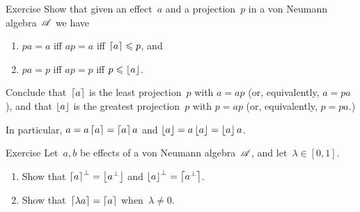 \documentclass[a]{subfiles}
\begin{document}
\begin{parsec}
\begin{point}{Exercise}%
Show that given an effect~$a$ and a projection~$p$
in a von Neumann algebra~$\mathscr{A}$ we have
\begin{enumerate}
\item
$pa=a$ iff $ap=a$ iff $\left\lceil a\right\rceil\leqslant p$, and
\item
$pa=p$ iff $ap=p$ iff $p\leqslant \left\lfloor a\right\rfloor$.
\end{enumerate}
Conclude that~$\left\lceil a\right\rceil$
is the least projection~$p$ with $a=a p$
(or, equivalently, $a=pa$),
and that $\left\lfloor a\right\rfloor$
is the greatest projection~$p$ with $p=a p$
(or, equivalently, $p=pa$.)

In particular,
$a=a\left\lceil a\right\rceil=\left\lceil a\right\rceil a$
and $\left\lfloor a\right\rfloor=a\left\lfloor a\right\rfloor=\left\lfloor a\right\rfloor a$.
\end{point}
\begin{point}{Exercise}%
Let~$a,b$ be effects of a von Neumann algebra~$\mathscr{A}$,
and let~$\lambda\in [0,1]$.
\begin{enumerate}
\item
Show that $\left\lceil a\right\rceil^\perp = \left\lfloor a^\perp\right\rfloor$
and $\left\lfloor a\right\rfloor^\perp = \left\lceil a^\perp\right\rceil$.
\item
Show that~$\left\lceil\lambda a\right\rceil = \left\lceil a\right\rceil$
when~$\lambda\neq 0$.


\end{enumerate}
\end{point}
\end{parsec}
\end{document}
